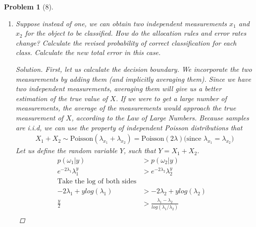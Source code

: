 \documentclass[11pt]{article}
\theoremstyle{quest}
\newtheorem*{problem}{Problem}
\newenvironment{solution}
  {\begin{mdframed}\begin{proof}[Solution]}
  {\end{proof}\end{mdframed}}
\begin{document}
\begin{problem}[8]
\begin{enumerate}[label=(\alph*)]
\begin{solution}
\begin{align*}
                \end{align*}
                Total error rate
                \begin{align*}
                    p(\text{error}) &= 1 - p(\omega_1 \text{ correct})p(\omega_1) - p(\omega_2 \text{ correct})p(\omega_2) &\\
                    p(\text{error}) &= 1 - 0.791 * 0.5 - 0.732 * 0.5 &\\
                    p(\text{error}) &= 0.238 &\\
                \end{align*}
            \end{solution}
        \item Suppose instead of one, we can obtain two independent measurements $x_1$ and $x_2$ for the object to be classified. How do the allocation rules and error rates change? Calculate the revised probability of correct classification for each class. Calculate the new total error in this case.
            \begin{solution}
                First, let us calculate the decision boundary. We incorporate the two measurements by adding them (and implicitly averaging them). Since we have two independent measurements, averaging them will give us a better estimation of the true value of $X$. If we were to get a large number of measurements, the average of the measurements  would approach the true measurement of $X$, according to the Law of Large Numbers. Because samples are i.i.d, we can use the property of independent Poisson distributions that
                \begin{align*}
                    X_1 + X_2 \sim \text{Poisson}(\lambda_{x_1} + \lambda_{x_2}) = \text{Poisson}(2 \lambda) \text{(since $\lambda_{x_1} = \lambda_{x_2}$)}
                \end{align*}
                Let us define the random variable $Y$, such that $Y = X_1 + X_2$.
                \begin{align*}
                    p(\omega_1|y) &> p(\omega_2|y) & \\
                    e^{-2\lambda_1}\lambda_1^y &> e^{-2\lambda_2}\lambda_2^y & \\
                    \text{Take the log of both sides} & \\
                    -2\lambda_1 + y log(\lambda_1) &> -2\lambda_2 + y log(\lambda_2) &\\
                    \frac{y}{2}  &> \frac{\lambda_1 - \lambda_2}{log(\lambda_1 / \lambda_2)} &\\

\end{align*}
\end{solution}
\end{enumerate}
\end{problem}
\end{document}
